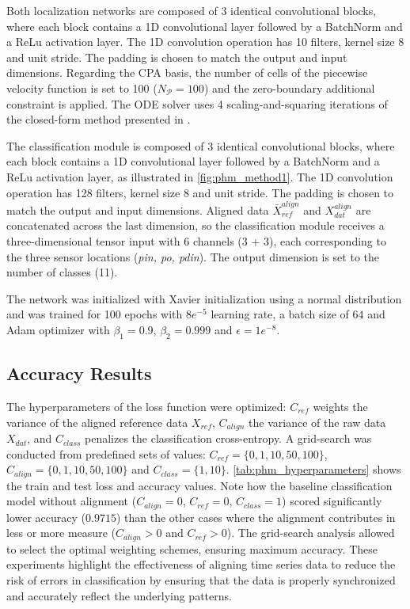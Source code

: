 Both localization networks are composed of 3 identical convolutional blocks, where each block contains a 1D convolutional layer followed by a BatchNorm and a ReLu activation layer. The 1D convolution operation has 10 filters, kernel size 8 and unit stride. The padding is chosen to match the output and input dimensions.
Regarding the CPA basis, the number of cells of the piecewise velocity function is set to 100 ($N_{\mathcal{P}}=100$) and the zero-boundary additional constraint is applied. The ODE solver uses 4 scaling-and-squaring iterations of the closed-form method presented in \cite{martinez2022closed}.

The classification module is composed of 3 identical convolutional blocks, where each block contains a 1D convolutional layer followed by a BatchNorm and a ReLu activation layer, as illustrated in \cref{fig:phm_method1}. The 1D convolution operation has 128 filters, kernel size 8 and unit stride. The padding is chosen to match the output and input dimensions. Aligned data $\bar{X}_{ref}^{align}$ and $X_{dat}^{align}$ are concatenated across the last dimension, so the classification module receives a three-dimensional tensor input with 6 channels (3 + 3), each corresponding to the three sensor locations (\textit{pin, po, pdin}). The output dimension is set to the number of classes (11).

The network was initialized with Xavier initialization \cite{glorot2010understanding} using a normal distribution and was trained for 100 epochs with $8e^{-5}$ learning rate, a batch size of $64$ and Adam \cite{kingma2014adam} optimizer with $\beta_{1}=0.9$, $\beta_{2}=0.999$ and $\epsilon=1e^{-8}$.

\subsection{Accuracy Results}
The hyperparameters of the loss function were optimized: $C_{ref}$ weights the variance of the aligned reference data $X_{ref}$, $C_{align}$ the variance of the raw data $X_{dat}$, and $C_{class}$ penalizes the classification cross-entropy. A grid-search was conducted from predefined sets of values: $C_{ref}=\{0,1,10,50,100\}$, $C_{align}=\{0,1,10,50,100\}$ and $C_{class}=\{1,10\}$.
\cref{tab:phm_hyperparameters} shows the train and test loss and accuracy values. Note how the baseline classification model without alignment ($C_{align}=0$, $C_{ref}=0$, $C_{class}=1$) scored significantly lower accuracy ($0.9715$) than the other cases where the alignment contributes in less or more measure ($C_{align}>0$ and $C_{ref}>0$). 
The grid-search analysis allowed to select the optimal weighting schemes, ensuring maximum accuracy. 
These experiments highlight the effectiveness of aligning time series data to reduce the risk of errors in classification by ensuring that the data is properly synchronized and accurately reflect the underlying patterns.

